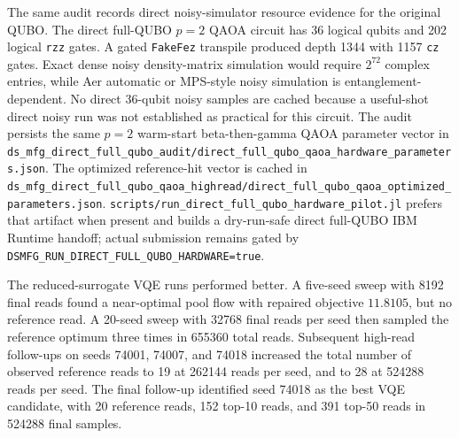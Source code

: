 The same audit records direct noisy-simulator resource evidence for the
original QUBO. The direct full-QUBO $p=2$ QAOA circuit has 36 logical qubits and
202 logical \texttt{rzz} gates. A gated \texttt{FakeFez} transpile produced
depth 1344 with 1157 \texttt{cz} gates. Exact dense noisy density-matrix
simulation would require $2^{72}$ complex entries, while Aer automatic or
MPS-style noisy simulation is entanglement-dependent. No direct 36-qubit noisy
samples are cached because a useful-shot direct noisy run was not established as
practical for this circuit. The audit persists the same $p=2$ warm-start
beta-then-gamma QAOA parameter vector in
\texttt{ds\_mfg\_direct\_full\_qubo\_audit/direct\_full\_qubo\_qaoa\_hardware\_parameters.json}.
The optimized reference-hit vector is cached in
\texttt{ds\_mfg\_direct\_full\_qubo\_qaoa\_highread/direct\_full\_qubo\_qaoa\_optimized\_parameters.json}.
\texttt{scripts/run\_direct\_full\_qubo\_hardware\_pilot.jl} prefers that
artifact when present and builds a dry-run-safe direct full-QUBO IBM Runtime
handoff; actual submission remains gated by
\texttt{DSMFG\_RUN\_DIRECT\_FULL\_QUBO\_HARDWARE=true}.

The reduced-surrogate VQE runs performed better. A five-seed sweep with 8192
final reads found a near-optimal pool flow with repaired objective $11.8105$,
but no reference read. A 20-seed sweep with 32768 final reads per seed then
sampled the reference optimum three times in 655360 total reads. Subsequent
high-read follow-ups on seeds 74001, 74007, and 74018 increased the total
number of observed reference reads to 19 at 262144 reads per seed, and to 28 at
524288 reads per seed. The final follow-up identified seed 74018 as the best
VQE candidate, with 20 reference reads, 152 top-10 reads, and 391 top-50 reads in
524288 final samples.

